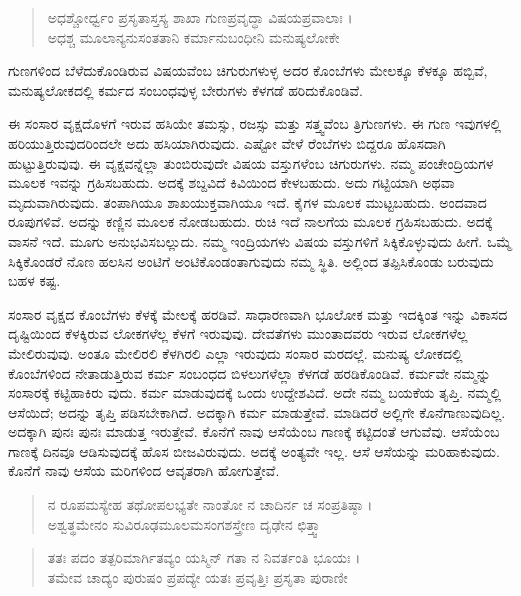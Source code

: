 \begin{verse}
ಅಧಶ್ಚೋರ್ಧ್ವಂ ಪ್ರಸೃತಾಸ್ತಸ್ಯ ಶಾಖಾ ಗುಣಪ್ರವೃದ್ಧಾ ವಿಷಯಪ್ರವಾಲಾಃ ।\\ಅಧಶ್ಚ ಮೂಲಾನ್ಯನುಸಂತತಾನಿ ಕರ್ಮಾನುಬಂಧೀನಿ ಮನುಷ್ಯಲೋಕೇ 
\end{verse}

{\small ಗುಣಗಳಿಂದ ಬೆಳೆದುಕೊಂಡಿರುವ ವಿಷಯವೆಂಬ ಚಿಗುರುಗಳುಳ್ಳ ಅದರ ಕೊಂಬೆಗಳು ಮೇಲಕ್ಕೂ ಕೆಳಕ್ಕೂ ಹಬ್ಬಿವೆ, ಮನುಷ್ಯಲೋಕದಲ್ಲಿ ಕರ್ಮದ ಸಂಬಂಧವುಳ್ಳ ಬೇರುಗಳು ಕೆಳಗಡೆ ಹರಿದುಕೊಂಡಿವೆ.}

ಈ ಸಂಸಾರ ವೃಕ್ಷದೊಳಗೆ ಇರುವ ಹಸಿಯೇ ತಮಸ್ಸು, ರಜಸ್ಸು ಮತ್ತು ಸತ್ತ್ವವೆಂಬ ತ್ರಿಗುಣಗಳು. ಈ ಗುಣ ಇವುಗಳಲ್ಲಿ ಹರಿಯುತ್ತಿರುವುದರಿಂದಲೇ ಅದು ಹಸಿಯಾಗಿರುವುದು. ಎಷ್ಟೋ ವೇಳೆ ರೆಂಬೆಗಳು ಬಿದ್ದರೂ ಹೊಸದಾಗಿ ಹುಟ್ಟುತ್ತಿರುವುವು. ಈ ವೃಕ್ಷವನ್ನೆಲ್ಲಾ ತುಂಬಿರುವುದೇ ವಿಷಯ ವಸ್ತುಗಳೆಂಬ ಚಿಗುರುಗಳು. ನಮ್ಮ ಪಂಚೇಂದ್ರಿಯಗಳ ಮೂಲಕ ಇವನ್ನು ಗ್ರಹಿಸಬಹುದು. ಅದಕ್ಕೆ ಶಬ್ದವಿದೆ ಕಿವಿಯಿಂದ ಕೇಳಬಹುದು. ಅದು ಗಟ್ಟಿಯಾಗಿ ಅಥವಾ ಮೃದುವಾಗಿರುವುದು. ತಂಪಾಗಿಯೂ ಶಾಖಯುಕ್ತವಾಗಿಯೂ ಇದೆ. ಕೈಗಳ ಮೂಲಕ ಮುಟ್ಟಬಹುದು. ಅಂದವಾದ ರೂಪುಗಳಿವೆ. ಅದನ್ನು ಕಣ್ಣಿನ ಮೂಲಕ ನೋಡಬಹುದು. ರುಚಿ ಇದೆ ನಾಲಗೆಯ ಮೂಲಕ ಗ್ರಹಿಸಬಹುದು. ಅದಕ್ಕೆ ವಾಸನೆ ಇದೆ. ಮೂಗು ಅನುಭವಿಸಬಲ್ಲುದು. ನಮ್ಮ ಇಂದ್ರಿಯಗಳು ವಿಷಯ ವಸ್ತುಗಳಿಗೆ ಸಿಕ್ಕಿಕೊಳ್ಳುವುದು ಹೀಗೆ. ಒಮ್ಮೆ ಸಿಕ್ಕಿಕೊಂಡರೆ ನೊಣ ಹಲಸಿನ ಅಂಟಿಗೆ ಅಂಟಿಕೊಂಡಂತಾಗುವುದು ನಮ್ಮ ಸ್ಥಿತಿ. ಅಲ್ಲಿಂದ ತಪ್ಪಿಸಿಕೊಂಡು ಬರುವುದು ಬಹಳ ಕಷ್ಟ.

ಸಂಸಾರ ವೃಕ್ಷದ ಕೊಂಬೆಗಳು ಕೆಳಕ್ಕೆ ಮೇಲಕ್ಕೆ ಹರಡಿವೆ. ಸಾಧಾರಣವಾಗಿ ಭೂಲೋಕ ಮತ್ತು ಇದಕ್ಕಿಂತ ಇನ್ನು ವಿಕಾಸದ ದೃಷ್ಟಿಯಿಂದ ಕೆಳಕ್ಕಿರುವ ಲೋಕಗಳೆಲ್ಲ ಕೆಳಗೆ ಇರುವುವು. ದೇವತೆಗಳು ಮುಂತಾದವರು ಇರುವ ಲೋಕಗಳೆಲ್ಲ ಮೇಲಿರುವುವು. ಅಂತೂ ಮೇಲಿರಲಿ ಕೆಳಗಿರಲಿ ಎಲ್ಲಾ ಇರುವುದು ಸಂಸಾರ ಮರದಲ್ಲೆ. ಮನುಷ್ಯ ಲೋಕದಲ್ಲಿ ಕೊಂಬೆಗಳಿಂದ ನೇತಾಡುತ್ತಿರುವ ಕರ್ಮ ಸಂಬಂಧದ ಬಿಳಲುಗಳೆಲ್ಲಾ ಕೆಳಗಡೆ ಹರಡಿಕೊಂಡಿವೆ. ಕರ್ಮವೇ ನಮ್ಮನ್ನು ಸಂಸಾರಕ್ಕೆ ಕಟ್ಟಿಹಾಕಿರು ವುದು. ಕರ್ಮ ಮಾಡುವುದಕ್ಕೆ ಒಂದು ಉದ್ದೇಶವಿದೆ. ಅದೇ ನಮ್ಮ ಬಯಕೆಯ ತೃಪ್ತಿ. ನಮ್ಮಲ್ಲಿ ಆಸೆಯಿದೆ; ಅದನ್ನು ತೃಪ್ತಿ ಪಡಿಸಬೇಕಾಗಿದೆ. ಅದಕ್ಕಾಗಿ ಕರ್ಮ ಮಾಡುತ್ತೇವೆ. ಮಾಡಿದರೆ ಅಲ್ಲಿಗೇ ಕೊನೆಗಾಣುವುದಿಲ್ಲ. ಅದಕ್ಕಾಗಿ ಪುನಃ ಪುನಃ ಮಾಡುತ್ತ ಇರುತ್ತೇವೆ. ಕೊನೆಗೆ ನಾವು ಆಸೆಯೆಂಬ ಗಾಣಕ್ಕೆ ಕಟ್ಟಿದಂತೆ ಆಗುವೆವು. ಆಸೆಯೆಂಬ ಗಾಣಕ್ಕೆ ದಿನವೂ ಆಡಿಸುವುದಕ್ಕೆ ಹೊಸ ಬೀಜವಿರುವುದು. ಅದಕ್ಕೆ ಅಂತ್ಯವೇ ಇಲ್ಲ. ಆಸೆ ಆಸೆಯನ್ನು ಮರಿಹಾಕುವುದು. ಕೊನೆಗೆ ನಾವು ಆಸೆಯ ಮರಿಗಳಿಂದ ಆವೃತರಾಗಿ ಹೋಗುತ್ತೇವೆ.

\begin{verse}
ನ ರೂಪಮಸ್ಯೇಹ ತಥೋಪಲಭ್ಯತೇ ನಾಂತೋ ನ ಚಾದಿರ್ನ ಚ ಸಂಪ್ರತಿಷ್ಠಾ ।\\ಅಶ್ವತ್ಥಮೇನಂ ಸುವಿರೂಢಮೂಲಮಸಂಗಶಸ್ತ್ರೇಣ ದೃಢೇನ ಛಿತ್ತ್ವಾ 
\end{verse}

\begin{verse}
ತತಃ ಪದಂ ತತ್ಪರಿಮಾರ್ಗಿತವ್ಯಂ ಯಸ್ಮಿನ್ ಗತಾ ನ ನಿವರ್ತಂತಿ ಭೂಯಃ ।\\ತಮೇವ ಚಾದ್ಯಂ ಪುರುಷಂ ಪ್ರಪದ್ಯೇ ಯತಃ ಪ್ರವೃತ್ತಿಃ ಪ್ರಸೃತಾ ಪುರಾಣೀ 
\end{verse}

